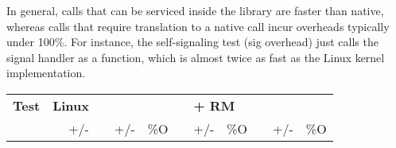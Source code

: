 In general, calls that can be serviced inside the library are faster than native,
whereas calls that require translation to a native call incur overheads typically under 100\%.
For instance, 
the self-signaling test (sig overhead)
just calls the signal handler as a function,
which is almost twice as fast
as the Linux kernel implementation.  

\begin{table}[t!b!]
\footnotesize
\centering
\begin{tabular}{|l|rr|rrr|rrr|rrr|}
\hline
{\bf Test } & \multicolumn{2}{c|}{{\bf Linux}} & \multicolumn{3}{c|}{{\bf \sysname{}
}} & \multicolumn{3}{c|}{{\bf \sysname{} + RM}} & \multicolumn{3}{c|}{{\bf \graphenesgx{}}} \\

&
{\footnotesize \us{}} & {\footnotesize +/-} & 
{\footnotesize \us{}} & {\footnotesize +/-} & \%O &
{\footnotesize \us{}} & {\footnotesize +/-} & \%O & 
{\footnotesize \us{}} & {\footnotesize +/-} & \%O \\

\hline


\end{tabular}
\end{table}
